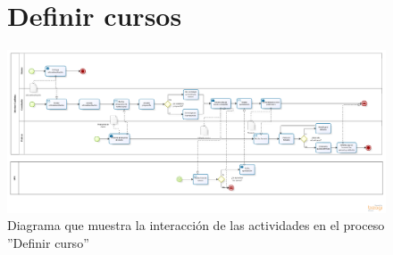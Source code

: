 \begin{landscape}
  \begin{figure}[b]
  \section{Definir cursos} 
	\hspace{4cm}
  \begin{center}
      \includegraphics[width=22cm]{images/DefinirCurso}
       \caption{Diagrama que muestra la  interacción de las actividades en el proceso ''Definir curso''}
  \end{center}
 \end{figure}
\end{landscape}


%
%


